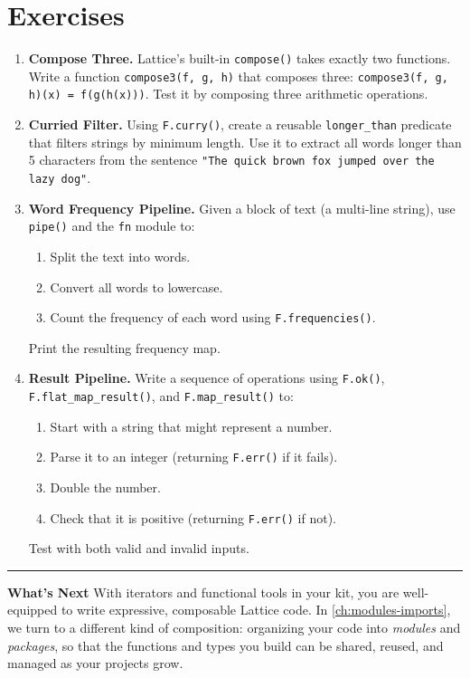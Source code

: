 \section{Exercises}\label{sec:fp-exercises}

\begin{enumerate}
  \item \textbf{Compose Three.}
    Lattice's built-in \lstinline|compose()| takes exactly two functions.
    Write a function \lstinline|compose3(f, g, h)| that composes three: \lstinline|compose3(f, g, h)(x) = f(g(h(x)))|.
    Test it by composing three arithmetic operations.

  \item \textbf{Curried Filter.}
    Using \lstinline|F.curry()|, create a reusable \lstinline|longer_than| predicate that filters strings by minimum length.
    Use it to extract all words longer than 5 characters from the sentence \lstinline|"The quick brown fox jumped over the lazy dog"|.

  \item \textbf{Word Frequency Pipeline.}
    Given a block of text (a multi-line string), use \lstinline|pipe()| and the \lstinline|fn| module to:
    \begin{enumerate}[nosep]
      \item Split the text into words.
      \item Convert all words to lowercase.
      \item Count the frequency of each word using \lstinline|F.frequencies()|.
    \end{enumerate}
    Print the resulting frequency map.

  \item \textbf{Result Pipeline.}
    Write a sequence of operations using \lstinline|F.ok()|, \lstinline|F.flat_map_result()|, and \lstinline|F.map_result()| to:
    \begin{enumerate}[nosep]
      \item Start with a string that might represent a number.
      \item Parse it to an integer (returning \lstinline|F.err()| if it fails).
      \item Double the number.
      \item Check that it is positive (returning \lstinline|F.err()| if not).
    \end{enumerate}
    Test with both valid and invalid inputs.
\end{enumerate}

\bigskip
\begin{center}\rule{0.5\linewidth}{0.4pt}\end{center}
\medskip

\noindent\textbf{What's Next}\quad
With iterators and functional tools in your kit, you are well-equipped to write expressive, composable Lattice code.
In \cref{ch:modules-imports}, we turn to a different kind of composition: organizing your code into \emph{modules} and \emph{packages}, so that the functions and types you build can be shared, reused, and managed as your projects grow.
